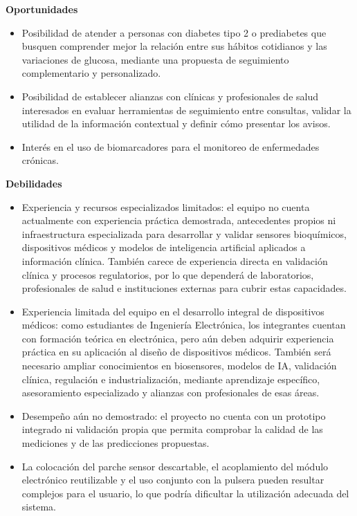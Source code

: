 \noindent\textbf{Oportunidades}
\begin{itemize}
    \item Posibilidad de atender a personas con diabetes tipo 2 o prediabetes que busquen comprender mejor la relación entre sus hábitos cotidianos y las variaciones de glucosa, mediante una propuesta de seguimiento complementario y personalizado.
    \item Posibilidad de establecer alianzas con clínicas y profesionales de salud interesados en evaluar herramientas de seguimiento entre consultas, validar la utilidad de la información contextual y definir cómo presentar los avisos.
    \item Interés en el uso de biomarcadores para el monitoreo de enfermedades crónicas.
\end{itemize}

\noindent\textbf{Debilidades}
\begin{itemize}
    \item Experiencia y recursos especializados limitados: el equipo no cuenta actualmente con experiencia práctica demostrada, antecedentes propios ni infraestructura especializada para desarrollar y validar sensores bioquímicos, dispositivos médicos y modelos de inteligencia artificial aplicados a información clínica. También carece de experiencia directa en validación clínica y procesos regulatorios, por lo que dependerá de laboratorios, profesionales de salud e instituciones externas para cubrir estas capacidades.
    \item Experiencia limitada del equipo en el desarrollo integral de dispositivos médicos: como estudiantes de Ingeniería Electrónica, los integrantes cuentan con formación teórica en electrónica, pero aún deben adquirir experiencia práctica en su aplicación al diseño de dispositivos médicos. También será necesario ampliar conocimientos en biosensores, modelos de IA, validación clínica, regulación e industrialización, mediante aprendizaje específico, asesoramiento especializado y alianzas con profesionales de esas áreas.
    \item Desempeño aún no demostrado: el proyecto no cuenta con un prototipo integrado ni validación propia que permita comprobar la calidad de las mediciones y de las predicciones propuestas.
    \item La colocación del parche sensor descartable, el acoplamiento del módulo electrónico reutilizable y el uso conjunto con la pulsera pueden resultar complejos para el usuario, lo que podría dificultar la utilización adecuada del sistema.
\end{itemize}


